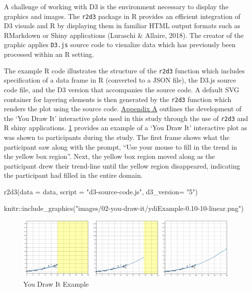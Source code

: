 \documentclass[print]{nuthesis}
\newenvironment{Shaded}{\begin{snugshade}}{\end{snugshade}}
\newcommand{\AttributeTok}[1]{\textcolor[rgb]{0.77,0.63,0.00}{#1}}
\newcommand{\FunctionTok}[1]{\textcolor[rgb]{0.00,0.00,0.00}{#1}}
\newcommand{\NormalTok}[1]{#1}
\newcommand{\SpecialCharTok}[1]{\textcolor[rgb]{0.00,0.00,0.00}{#1}}
\newcommand{\StringTok}[1]{\textcolor[rgb]{0.31,0.60,0.02}{#1}}
\begin{document}
A challenge of working with D3 is the environment necessary to display the graphics and images.
The \texttt{r2d3} package in R provides an efficient integration of D3 visuals and R by displaying them in familiar HTML output formats such as RMarkdown or Shiny applications (Luraschi \& Allaire, 2018).
The creator of the graphic applies \texttt{D3.js} source code to visualize data which has previously been processed within an R setting.

The example R code illustrates the structure of the \texttt{r2d3} function which includes specification of a data frame in R (converted to a JSON file), the D3.js source code file, and the D3 version that accompanies the source code.
A default SVG container for layering elements is then generated by the \texttt{r2d3} function which renders the plot using the source code.
\protect\hyperlink{youdrawit-with-shiny}{Appendix A} outlines the development of the `You Draw It' interactive plots used in this study through the use of \texttt{r2d3} and R shiny applications.
\cref{fig:youdrawit-example} provides an example of a `You Draw It' interactive plot as was shown to participants during the study.
The first frame shows what the participant saw along with the prompt, ``Use your mouse to fill in the trend in the yellow box region''.
Next, the yellow box region moved along as the participant drew their trend-line until the yellow region disappeared, indicating the participant had filled in the entire domain.

\begin{Shaded}
\begin{Highlighting}[]
\FunctionTok{r2d3}\NormalTok{(}\AttributeTok{data =}\NormalTok{ data,}
     \AttributeTok{script =} \StringTok{"d3{-}source{-}code.js"}\NormalTok{,}
     \AttributeTok{d3\_version=} \StringTok{"5"}\NormalTok{)}
\end{Highlighting}
\end{Shaded}

\begin{Shaded}
\begin{Highlighting}[]
\NormalTok{knitr}\SpecialCharTok{::}\FunctionTok{include\_graphics}\NormalTok{(}\StringTok{"images/02{-}you{-}draw{-}it/ydiExample{-}0.10{-}10{-}linear.png"}\NormalTok{)}
\end{Highlighting}
\end{Shaded}

\begin{figure}
\includegraphics[width=1\linewidth]{images/02-you-draw-it/ydiExample-0.10-10-linear} \caption{You Draw It Example}\label{fig:youdrawit-example}
\end{figure}
\end{document}
